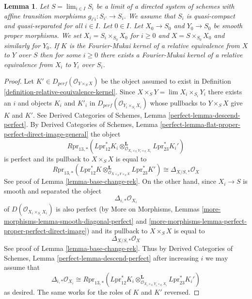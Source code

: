 \documentclass{stacks-project}
\theoremstyle{plain}
\newtheorem{lemma}[subsection]{Lemma}
\theoremstyle{definition}
\theoremstyle{remark}
\numberwithin{equation}{subsection}
\def\lim{\mathop{\mathrm{lim}}\nolimits}
\begin{document}
\begin{lemma}
\label{lemma-descend-rek}
Let $S = \lim_{i \in I} S_i$ be a limit of a directed system of schemes
with affine transition morphisms $g_{i'i} : S_{i'} \to S_i$.
We assume that $S_i$ is quasi-compact and quasi-separated for all $i \in I$.
Let $0 \in I$. Let $X_0 \to S_0$ and $Y_0 \to S_0$ be smooth proper morphisms.
We set $X_i = S_i \times_{S_0} X_0$ for $i \geq 0$
and $X = S \times_{S_0} X_0$ and similarly for $Y_0$. If $K$ is the
Fourier-Mukai kernel of a relative equivalence from $X$ to $Y$ over $S$
then for some $i \geq 0$ there exists a
Fourier-Mukai kernel of a relative equivalence from $X_i$ to $Y_i$ over $S_i$.
\end{lemma}

\begin{proof}
Let $K' \in D_{perf}(\mathcal{O}_{Y \times_S X})$ be the object assumed to
exist in Definition \ref{definition-relative-equivalence-kernel}.
Since $X \times_S Y = \lim X_i \times_{S_i} Y_i$ there exists an
$i$ and objects $K_i$ and $K'_i$ in
$D_{perf}(\mathcal{O}_{Y_i \times_{S_i} X_i})$
whose pullbacks to $Y \times_S X$ give $K$ and $K'$.
See Derived Categories of Schemes, Lemma \ref{perfect-lemma-descend-perfect}.
By Derived Categories of Schemes, Lemma
\ref{perfect-lemma-flat-proper-perfect-direct-image-general}
the object
$$
R\text{pr}_{13, *}(L\text{pr}_{12}^*K_i
\otimes_{\mathcal{O}_{X_i \times_{S_i} Y_i \times_{S_i} X_i}}^\mathbf{L}
L\text{pr}_{23}^*K_i')
$$
is perfect and its pullback to $X \times_S X$ is equal to
$$
R\text{pr}_{13, *}(L\text{pr}_{12}^*K
\otimes_{\mathcal{O}_{X \times_S Y \times_S X}}^\mathbf{L}
L\text{pr}_{23}^*K') \cong \Delta_{X/S, *}\mathcal{O}_X
$$
See proof of Lemma \ref{lemma-base-change-rek}.
On the other hand, since $X_i \to S$ is smooth and separated the
object
$$
\Delta_{i, *}\mathcal{O}_{X_i}
$$
of $D(\mathcal{O}_{X_i \times_{S_i} X_i})$ is also perfect
(by More on Morphisms, Lemmas
\ref{more-morphisms-lemma-smooth-diagonal-perfect} and
\ref{more-morphisms-lemma-perfect-proper-perfect-direct-image}) and
its pullback to $X \times_S X$ is equal to
$$
\Delta_{X/S, *}\mathcal{O}_X
$$
See proof of Lemma \ref{lemma-base-change-rek}. Thus by
Derived Categories of Schemes, Lemma \ref{perfect-lemma-descend-perfect}
after increasing $i$ we may assume that
$$
\Delta_{i, *}\mathcal{O}_{X_i} \cong
R\text{pr}_{13, *}(L\text{pr}_{12}^*K_i
\otimes_{\mathcal{O}_{X_i \times_{S_i} Y_i \times_{S_i} X_i}}^\mathbf{L}
L\text{pr}_{23}^*K_i')
$$
as desired. The same works for the roles of $K$ and $K'$ reversed.
\end{proof}
\end{document}
